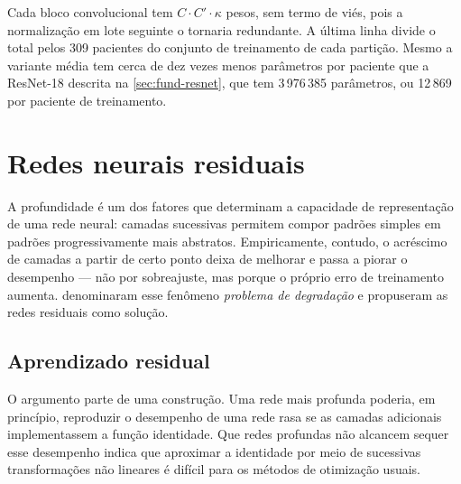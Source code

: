 Cada bloco convolucional tem $C \cdot C' \cdot \kappa$ pesos, sem termo de
viés, pois a normalização em lote seguinte o tornaria redundante. A última
linha divide o total pelos 309 pacientes do conjunto de treinamento de cada
partição. Mesmo a variante média tem cerca de dez vezes menos parâmetros por
paciente que a ResNet-18 descrita na \autoref{sec:fund-resnet}, que tem 3\,976\,385
parâmetros, ou 12\,869 por paciente de treinamento.


%
%

\section{Redes neurais residuais}
\label{sec:fund-resnet}

A profundidade é um dos fatores que determinam a capacidade de
representação de uma rede neural: camadas sucessivas permitem compor padrões
simples em padrões progressivamente mais abstratos. Empiricamente, contudo,
o acréscimo de camadas a partir de certo ponto deixa de melhorar e passa a
piorar o desempenho --- não por sobreajuste, mas porque o próprio erro de
treinamento aumenta.  denominaram esse fenômeno
\textit{problema de degradação} e propuseram as redes residuais como
solução.

\subsection{Aprendizado residual}
\label{subsec:fund-residual}

O argumento parte de uma construção. Uma rede mais profunda poderia, em
princípio, reproduzir o desempenho de uma rede rasa se as camadas
adicionais implementassem a função identidade. Que redes profundas não
alcancem sequer esse desempenho indica que aproximar a identidade por meio
de sucessivas transformações não lineares é difícil para os métodos de
otimização usuais.

